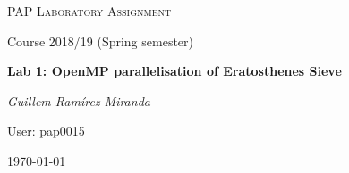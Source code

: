 \makeatletter
\begin{titlepage}
\thispagestyle{empty}
\begin{center}
	\centering
	\vspace{1cm}
	{\scshape\Large PAP Laboratory Assignment\par}
	\vspace{0.75cm}
	{\Large Course 2018/19 (Spring semester)\par}
	\vspace{0.75cm}
	{\huge\bfseries Lab 1: OpenMP parallelisation of Eratosthenes Sieve\par}
	\vspace{1cm}
	{\Large\itshape Guillem Ramírez Miranda\par}
    \vspace{0.5cm}
    {\Large User: pap0015\par}
    \vfill
	{\large \today\par}
\end{center}
\clearpage
\end{titlepage}
